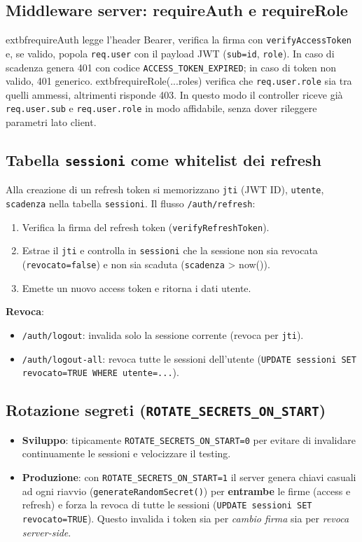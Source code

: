 \documentclass[12pt,a4paper]{article}
\begin{document}
\subsection{Middleware server: requireAuth e requireRole}
	extbf{requireAuth} legge l'header Bearer, verifica la firma con \texttt{verifyAccessToken} e, se valido, popola \texttt{req.user} con il payload JWT (\texttt{sub=id}, \texttt{role}). In caso di scadenza genera 401 con codice \texttt{ACCESS\_TOKEN\_EXPIRED}; in caso di token non valido, 401 generico.\newline
		extbf{requireRole(...roles)} verifica che \texttt{req.user.role} sia tra quelli ammessi, altrimenti risponde 403. In questo modo il controller riceve già \texttt{req.user.sub} e \texttt{req.user.role} in modo affidabile, senza dover rileggere parametri lato client.

\subsection{Tabella \texttt{sessioni} come whitelist dei refresh}
Alla creazione di un refresh token si memorizzano \texttt{jti} (JWT ID), \texttt{utente}, \texttt{scadenza} nella tabella \texttt{sessioni}. Il flusso \texttt{/auth/refresh}:
\begin{enumerate}[noitemsep]
	\item Verifica la firma del refresh token (\texttt{verifyRefreshToken}).
	\item Estrae il \texttt{jti} e controlla in \texttt{sessioni} che la sessione non sia revocata (\texttt{revocato=false}) e non sia scaduta (\texttt{scadenza} \textgreater{} now()).
	\item Emette un nuovo access token e ritorna i dati utente.
\end{enumerate}
\noindent\textbf{Revoca}:
\begin{itemize}[noitemsep]
	\item \texttt{/auth/logout}: invalida solo la sessione corrente (revoca per \texttt{jti}).
	\item \texttt{/auth/logout-all}: revoca tutte le sessioni dell'utente (\texttt{UPDATE sessioni SET revocato=TRUE WHERE utente=...}).
\end{itemize}

\subsection{Rotazione segreti (\texttt{ROTATE\_SECRETS\_ON\_START})}
\begin{itemize}[noitemsep]
	\item \textbf{Sviluppo}: tipicamente \texttt{ROTATE\_SECRETS\_ON\_START=0} per evitare di invalidare continuamente le sessioni e velocizzare il testing.
	\item \textbf{Produzione}: con \texttt{ROTATE\_SECRETS\_ON\_START=1} il server genera chiavi casuali ad ogni riavvio (\texttt{generateRandomSecret()}) per \textbf{entrambe} le firme (access e refresh) e forza la revoca di tutte le sessioni (\texttt{UPDATE sessioni SET revocato=TRUE}). Questo invalida i token sia per \emph{cambio firma} sia per \emph{revoca server-side}.
\end{itemize}
\end{document}
